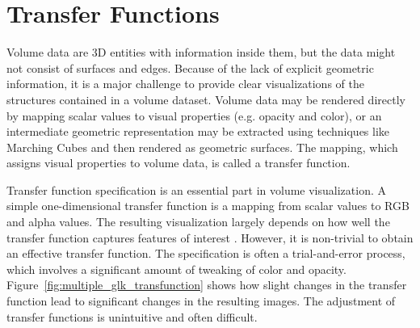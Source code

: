 


\section{Transfer Functions \label{literature_of_transfer_function}}
Volume data are 3D entities with information inside them, but the data might not consist of surfaces and edges.
Because of the lack of explicit geometric information, %
it is a major challenge to provide clear visualizations of the structures contained in a volume dataset.
Volume data may be rendered directly by mapping scalar values to visual properties (e.g. opacity and color), or an intermediate geometric representation may be extracted using techniques like Marching Cubes \cite{lorensen_marching_1987} and then rendered as geometric surfaces. The mapping, which assigns visual properties to volume data, is called a transfer function.

Transfer function specification is an essential part in volume visualization.
A simple one-dimensional transfer function is a mapping from scalar values to RGB and alpha values.
The resulting visualization largely depends on how well the transfer function captures features of interest \cite{kniss_multidimensional_2002}.
However, it is non-trivial to obtain an effective transfer function. The specification is often a trial-and-error process, which involves a significant amount of tweaking of color and opacity. Figure~\ref{fig:multiple_glk_transfunction} shows how slight changes in the transfer function lead to significant changes in the resulting images. The adjustment of transfer functions is unintuitive and often difficult.

